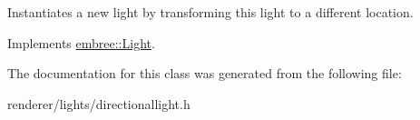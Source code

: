 Instantiates a new light by transforming this light to a different location. 



Implements \hyperlink{classembree_1_1_light_a6e5d5e7c2088ec4dad231c91d99c3a30}{embree::Light}.



The documentation for this class was generated from the following file:\begin{DoxyCompactItemize}
\item 
renderer/lights/directionallight.h\end{DoxyCompactItemize}
